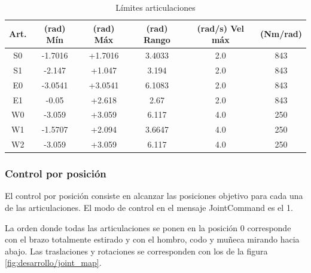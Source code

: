 \begin{table}[]
\centering
\caption{Límites articulaciones}
\label{tab:desarrollo/limits}
\begin{tabular}{cccccc}
Art.                    & (rad) Mín & (rad) Máx & (rad) Rango & (rad/s) Vel máx & (Nm/rad) \\ \hline
\multicolumn{1}{c|}{S0} & -1.7016   & +1.7016   & 3.4033      & 2.0             & 843      \\
\multicolumn{1}{c|}{S1} & -2.147    & +1.047    & 3.194       & 2.0             & 843      \\
\multicolumn{1}{c|}{E0} & -3.0541   & +3.0541   & 6.1083      & 2.0             & 843      \\
\multicolumn{1}{c|}{E1} & -0.05     & +2.618    & 2.67        & 2.0             & 843      \\
\multicolumn{1}{c|}{W0} & -3.059    & +3.059    & 6.117       & 4.0             & 250      \\
\multicolumn{1}{c|}{W1} & -1.5707   & +2.094    & 3.6647      & 4.0             & 250      \\
\multicolumn{1}{c|}{W2} & -3.059    & +3.059    & 6.117       & 4.0             & 250     
\end{tabular}
\end{table}

\subsubsection{Control por posición}
El control por posición consiste en alcanzar las posiciones objetivo para cada una de las articulaciones. El modo de control en el mensaje JointCommand es el 1.

La orden donde todas las articulaciones se ponen en la posición 0 corresponde con el brazo totalmente estirado y con el hombro, codo y muñeca mirando hacia abajo. Las traslaciones y rotaciones se corresponden con los de la figura \ref{fig:desarrollo/joint_map}.

